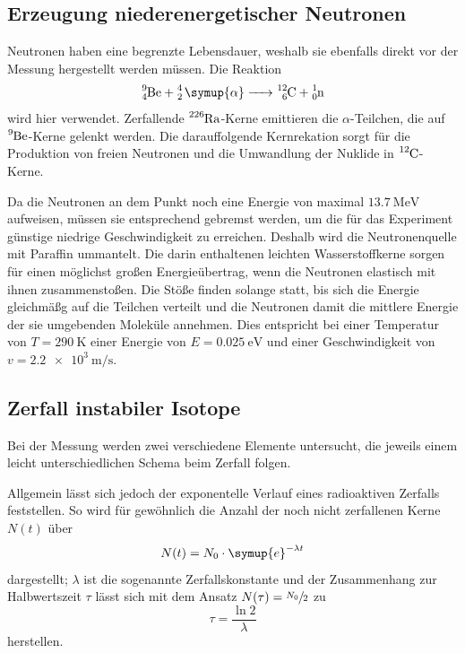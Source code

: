 \subsection{Erzeugung niederenergetischer Neutronen}

Neutronen haben eine begrenzte Lebensdauer, weshalb sie ebenfalls direkt vor der Messung hergestellt werden müssen. 
Die Reaktion 
\begin{equation*}
    \ce{^9_4Be + ^4_2 \symup{\alpha} -> ^{12}_6C + ^1_0n}
\end{equation*}
wird hier verwendet. 
Zerfallende $\ce{^{226}Ra}$-Kerne emittieren die $\alpha$-Teilchen, die auf $\ce{^9Be}$-Kerne gelenkt werden. 
Die darauffolgende Kernrekation sorgt für die Produktion von freien Neutronen und die Umwandlung der Nuklide in $\ce{^{12}C}$-Kerne. 

Da die Neutronen an dem Punkt noch eine Energie von maximal $\SI{13.7}{\mega\electronvolt}$ aufweisen, müssen sie 
entsprechend gebremst werden, um die für das Experiment günstige niedrige Geschwindigkeit zu erreichen. 
Deshalb wird die Neutronenquelle mit Paraffin ummantelt. Die darin enthaltenen leichten Wasserstoffkerne sorgen für einen 
möglichst großen Energieübertrag, wenn die Neutronen elastisch mit ihnen zusammenstoßen. 
Die Stöße finden solange statt, bis sich die Energie gleichmäßg auf die Teilchen verteilt und die Neutronen damit
die mittlere Energie der sie umgebenden Moleküle annehmen. Dies entspricht bei einer Temperatur von ${T=\SI{290}{\kelvin}}$ 
einer Energie von ${E=\SI{0.025}{\electronvolt}}$ und einer Geschwindigkeit von $v=\SI{2.2e3}{\meter\per\second}$. 

\subsection{Zerfall instabiler Isotope}
\label{sub:keineAhnung}

Bei der Messung werden zwei verschiedene Elemente untersucht, die jeweils einem leicht unterschiedlichen Schema beim Zerfall folgen. 

Allgemein lässt sich jedoch der exponentelle Verlauf eines radioaktiven Zerfalls feststellen. So wird für gewöhnlich die Anzahl der noch nicht zerfallenen Kerne $N(t)$ über 
\begin{equation*}
    N(t)=N_0 \cdot \symup{e}^{-\lambda t}
\end{equation*}
dargestellt; $\lambda$ ist die sogenannte Zerfallskonstante und der Zusammenhang zur Halbwertszeit $\tau$ lässt sich mit dem 
Ansatz $N(\tau)=\sfrac{N_0}{2}$ zu 
\begin{equation*}
    \tau=\frac{\ln 2}{\lambda}
\end{equation*}
herstellen.

